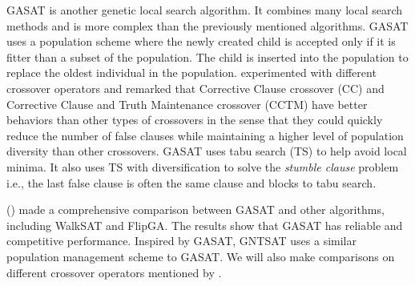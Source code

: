 GASAT \parencite{lardeux2006gasat} is another genetic local search algorithm. It
combines many local search methods and is more complex than the previously
mentioned algorithms. GASAT uses a population scheme where the newly created
child is accepted only if it is fitter than a subset of the population. The
child is inserted into the population to replace the oldest individual in the
population. \citeauthor{lardeux2006gasat} experimented with different crossover
operators and remarked that Corrective Clause crossover (CC) and Corrective
Clause and Truth Maintenance crossover (CCTM) have better behaviors than other
types of crossovers in the sense that they could quickly reduce the number of
false clauses while maintaining a higher level of population diversity than
other crossovers. GASAT uses tabu search (TS) to help avoid local minima. It
also uses TS with diversification to solve the \textit{stumble clause} problem
i.e., the last false clause is often the same clause and blocks to tabu search.

\citeauthor{lardeux2006gasat} (\citeyear{lardeux2006gasat}) made a comprehensive comparison between GASAT and other
algorithms, including WalkSAT and FlipGA. The results show that GASAT has
reliable and competitive performance. Inspired by GASAT, GNTSAT uses a similar
population management scheme to GASAT. We will also make comparisons on
different crossover operators mentioned by \citeauthor{lardeux2006gasat}.
